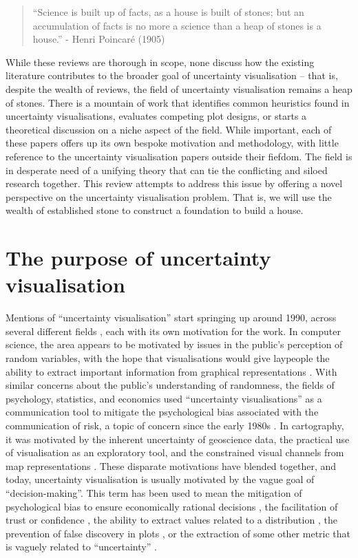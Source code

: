 \documentclass[]{ar-1col-S2O}
\begin{document}
\begin{quote}
``Science is built up of facts, as a house is built of stones; but an
accumulation of facts is no more a science than a heap of stones is a
house.'' - Henri Poincaré (1905)
\end{quote}

While these reviews are thorough in scope, none discuss how the existing
literature contributes to the broader goal of uncertainty visualisation
-- that is, despite the wealth of reviews, the field of uncertainty
visualisation remains a heap of stones. There is a mountain of work that
identifies common heuristics found in uncertainty visualisations,
evaluates competing plot designs, or starts a theoretical discussion on
a niche aspect of the field. While important, each of these papers
offers up its own bespoke motivation and methodology, with little
reference to the uncertainty visualisation papers outside their fiefdom.
The field is in desperate need of a unifying theory that can tie the
conflicting and siloed research together. This review attempts to
address this issue by offering a novel perspective on the uncertainty
visualisation problem. That is, we will use the wealth of established
stone to construct a foundation to build a house.

\section{The purpose of uncertainty
visualisation}\label{the-purpose-of-uncertainty-visualisation}

Mentions of ``uncertainty visualisation'' start springing up around
1990, across several different fields
\citep{Ibrekk1987, MacEachren1992}, each with its own motivation for the
work. In computer science, the area appears to be motivated by issues in
the public's perception of random variables, with the hope that
visualisations would give laypeople the ability to extract important
information from graphical representations \citep{Ibrekk1987}. With
similar concerns about the public's understanding of randomness, the
fields of psychology, statistics, and economics used ``uncertainty
visualisations'' as a communication tool to mitigate the psychological
bias associated with the communication of risk, a topic of concern since
the early 1980s \citep{Spiegelhalter2017}. In cartography, it was
motivated by the inherent uncertainty of geoscience data, the practical
use of visualisation as an exploratory tool, and the constrained visual
channels from map representations \citep{MacEachren1992}. These
disparate motivations have blended together, and today, uncertainty
visualisation is usually motivated by the vague goal of
``decision-making''. This term has been used to mean the mitigation of
psychological bias to ensure economically rational decisions
\citep{Padilla2022, Padilla2021, Kale2021}, the facilitation of trust or
confidence \citep{Zhao2023, Yang2023}, the ability to extract values
related to a distribution \citep{Sarma2023}, the prevention of false
discovery in plots \citep{Sarma2024, Koonchanok2023}, or the extraction
of some other metric that is vaguely related to ``uncertainty''
\citep{Chakraborty2024, Ndlovu2023}.
\end{document}
